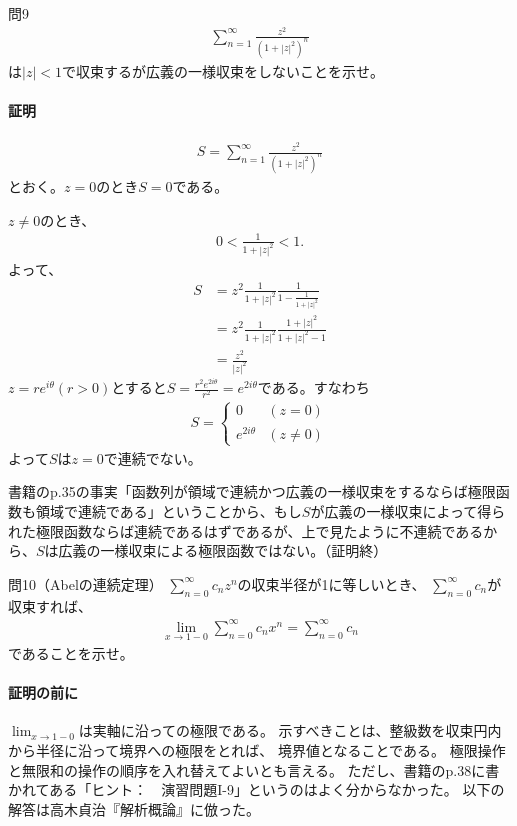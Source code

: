 \begin{mysimplebox}{問9}
    \begin{align*}
        \sum_{n=1}^{\infty}\frac{z^2}{(1+|z|^2)^n}
    \end{align*}
    は$|z|<1$で収束するが広義の一様収束をしないことを示せ。
\end{mysimplebox}
\paragraph{証明}
\begin{align*}
    S=\sum_{n=1}^{\infty}\frac{z^2}{(1+|z|^2)^n}
\end{align*}
とおく。$z=0$のとき$S=0$である。

$z\neq 0$のとき、
\begin{align*}
    0<\frac{1}{1+|z|^2}<1.
\end{align*}
よって、
\begin{align*}
    S&=z^2\frac{1}{1+|z|^2}\frac{1}{1-\frac{1}{1+|z|^2}}\\
    &=z^2\frac{1}{1+|z|^2}\frac{1+|z|^2}{1+|z|^2-1}\\
    &=\frac{z^2}{|z|^2}
\end{align*}
$z=re^{i\theta} (r>0)$とすると$S=\frac{r^2e^{2i\theta}}{r^2}=e^{2i\theta}$である。すなわち
\begin{align*}
    S=\left\{
        \begin{array}{cc}
            0 & (z=0)\\
            e^{2i\theta} & (z\neq 0)
        \end{array}
    \right.
\end{align*}
よって$S$は$z=0$で連続でない。

書籍のp.35の事実「函数列が領域で連続かつ広義の一様収束をするならば極限函数も領域で連続である」ということから、もし$S$が広義の一様収束によって得られた極限函数ならば連続であるはずであるが、上で見たように不連続であるから、$S$は広義の一様収束による極限函数ではない。（証明終）

\begin{mysimplebox}{問10（Abelの連続定理）}
    $\sum_{n=0}^{\infty}c_nz^n$の収束半径が1に等しいとき、
    $\sum_{n=0}^{\infty}c_n$が収束すれば、
    \begin{align*}
        \lim_{x\to 1-0}\sum_{n=0}^{\infty}c_nx^n=\sum_{n=0}^{\infty}c_n
    \end{align*}
    であることを示せ。
\end{mysimplebox}
\paragraph{証明の前に}
$\lim_{x\to 1-0}$は実軸に沿っての極限である。
示すべきことは、整級数を収束円内から半径に沿って境界への極限をとれば、
境界値となることである。
極限操作と無限和の操作の順序を入れ替えてよいとも言える。
ただし、書籍のp.38に書かれてある「ヒント：　演習問題I-9」というのはよく分からなかった。
以下の解答は高木貞治『解析概論』に倣った。

